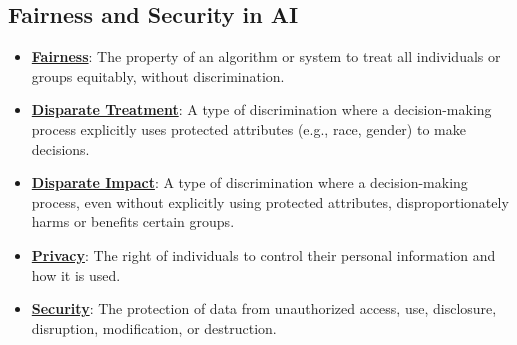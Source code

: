 \documentclass{article}%
\begin{document}
\subsection{Fairness and Security in AI}%
\label{subsec:FairnessandSecurityinAI}%
\begin{itemize}[leftmargin=*]%
\item \href{https://purdue.brightspace.com/d2l/common/assets/pdfjs-d2l-dist/1.0.14-legacy/web/viewer.html?file=\%2Fcontent\%2Fenforced\%2F1095467-wl.202510.CS.24300.001\%2F16L2-ethics.pdf\%3Fou\%3D1095467\&lang=en-us\&container=d2l-fileviewer-rendered-pdf\&fullscreen=d2l-fileviewer-rendered-pdf-dialog\&height=667#page=2}{\textbf{Fairness}}: The property of an algorithm or system to treat all individuals or groups equitably, without discrimination.%
\item \href{https://purdue.brightspace.com/d2l/common/assets/pdfjs-d2l-dist/1.0.14-legacy/web/viewer.html?file=\%2Fcontent\%2Fenforced\%2F1095467-wl.202510.CS.24300.001\%2F16L2-ethics.pdf\%3Fou\%3D1095467\&lang=en-us\&container=d2l-fileviewer-rendered-pdf\&fullscreen=d2l-fileviewer-rendered-pdf-dialog\&height=667#page=19}{\textbf{Disparate Treatment}}: A type of discrimination where a decision-making process explicitly uses protected attributes (e.g., race, gender) to make decisions.%
\item \href{https://purdue.brightspace.com/d2l/common/assets/pdfjs-d2l-dist/1.0.14-legacy/web/viewer.html?file=\%2Fcontent\%2Fenforced\%2F1095467-wl.202510.CS.24300.001\%2F16L2-ethics.pdf\%3Fou\%3D1095467\&lang=en-us\&container=d2l-fileviewer-rendered-pdf\&fullscreen=d2l-fileviewer-rendered-pdf-dialog\&height=667#page=19}{\textbf{Disparate Impact}}: A type of discrimination where a decision-making process, even without explicitly using protected attributes, disproportionately harms or benefits certain groups.%
\item \href{https://purdue.brightspace.com/d2l/common/assets/pdfjs-d2l-dist/1.0.14-legacy/web/viewer.html?file=\%2Fcontent\%2Fenforced\%2F1095467-wl.202510.CS.24300.001\%2F16L2-ethics.pdf\%3Fou\%3D1095467\&lang=en-us\&container=d2l-fileviewer-rendered-pdf\&fullscreen=d2l-fileviewer-rendered-pdf-dialog\&height=667#page=9}{\textbf{Privacy}}: The right of individuals to control their personal information and how it is used.%
\item \href{https://purdue.brightspace.com/d2l/common/assets/pdfjs-d2l-dist/1.0.14-legacy/web/viewer.html?file=\%2Fcontent\%2Fenforced\%2F1095467-wl.202510.CS.24300.001\%2F16L2-ethics.pdf\%3Fou\%3D1095467\&lang=en-us\&container=d2l-fileviewer-rendered-pdf\&fullscreen=d2l-fileviewer-rendered-pdf-dialog\&height=667#page=11}{\textbf{Security}}: The protection of data from unauthorized access, use, disclosure, disruption, modification, or destruction.%

\end{itemize}
\end{document}
